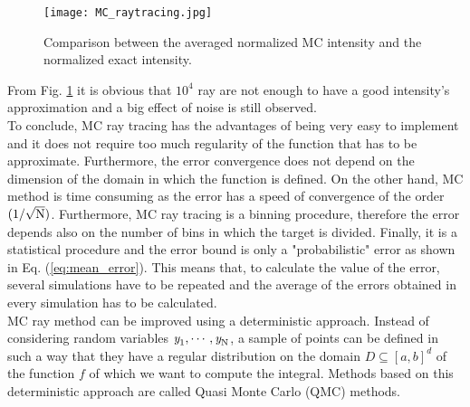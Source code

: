 \begin{figure}[t]
\begin{center}
    \texttt{[image: MC\_raytracing.jpg]}
    \caption{Comparison between the averaged normalized MC intensity and the normalized exact intensity.}
   \label{fig:mc_raytrancing_intensity}
\end{center}
\end{figure}
From Fig. \ref{fig:mc_raytrancing_intensity} it is obvious that $10^4$ ray are not enough to have a good intensity's approximation and a big effect of noise is still observed. 
\\ \indent
To conclude, MC ray tracing has the advantages of being very easy to implement and it does not require too much regularity of the function that has to be approximate. Furthermore, the error convergence does not depend on the dimension of the domain in which the function is defined. 
On the other hand, MC method is time consuming as the error has a speed of convergence of the order $(1/\sqrt{\textrm{N}})$. Furthermore, MC ray tracing is a binning procedure, therefore the error depends also on the number of bins in which the target is divided. Finally, it is a statistical procedure and the error bound is only a "probabilistic" error as shown in Eq. (\ref{eq:mean_error}). This means that, to calculate the value of the error, several simulations have to be repeated and the average of the errors obtained in every simulation has to be calculated. \\ \indent MC ray method can be improved using a deterministic approach. 
Instead of considering random variables $\textit{y}_1, \cdots, \textit{y}_{\textrm{N}}$, a sample of points can be defined in such a way that they have a regular distribution on the domain $D\subseteq[a,b]^d$ of the function $f$ of which we want to compute the integral. Methods based on this deterministic approach are called Quasi Monte Carlo (QMC) methods.
